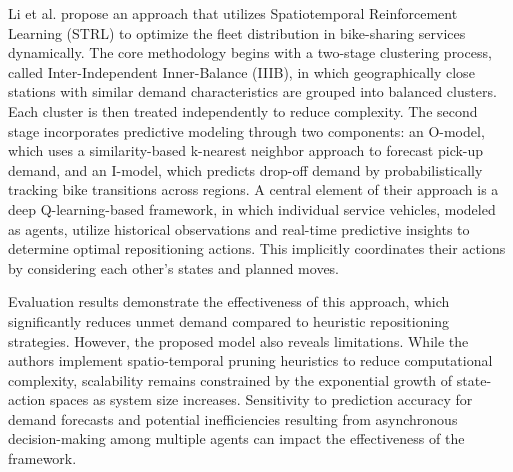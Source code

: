 Li et al. \cite {li_dynamic_2018} propose an approach that utilizes Spatiotemporal Reinforcement Learning (STRL) to optimize the fleet distribution in bike-sharing services dynamically. 
The core methodology begins with a two-stage clustering process, called Inter-Independent Inner-Balance (IIIB), in which geographically close stations with similar demand characteristics are grouped into balanced clusters.
Each cluster is then treated independently to reduce complexity. 
The second stage incorporates predictive modeling through two components: an O-model, which uses a similarity-based k-nearest neighbor approach to forecast pick-up demand, and an I-model, which predicts drop-off demand by probabilistically tracking bike transitions across regions. 
A central element of their approach is a deep Q-learning-based framework, in which individual service vehicles, modeled as agents, utilize historical observations and real-time predictive insights to determine optimal repositioning actions.
This implicitly coordinates their actions by considering each other's states and planned moves.

Evaluation results demonstrate the effectiveness of this approach, which significantly reduces unmet demand compared to heuristic repositioning strategies. 
However, the proposed model also reveals limitations. 
While the authors implement spatio-temporal pruning heuristics to reduce computational complexity, scalability remains constrained by the exponential growth of state-action spaces as system size increases. 
Sensitivity to prediction accuracy for demand forecasts and potential inefficiencies resulting from asynchronous decision-making among multiple agents can impact the effectiveness of the framework.
\\

